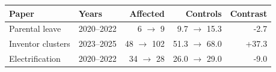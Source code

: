 \begin{tabular}{llrrr}
\toprule
Paper & Years & Affected & Controls & Contrast \\
\midrule
Parental leave & 2020--2022 & 6 $\to$ 9 & 9.7 $\to$ 15.3 & -2.7 \\
Inventor clusters & 2023--2025 & 48 $\to$ 102 & 51.3 $\to$ 68.0 & +37.3 \\
Electrification & 2020--2022 & 34 $\to$ 28 & 26.0 $\to$ 29.0 & -9.0 \\
\bottomrule
\end{tabular}
